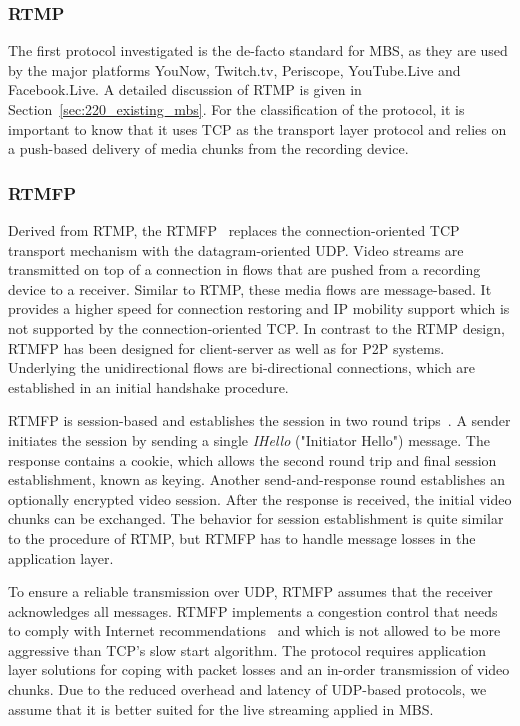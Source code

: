 \subsubsection{\acf{RTMP}}
The first protocol investigated is the de-facto standard for \ac{MBS}, as they are used by the major platforms YouNow, Twitch.tv, Periscope, YouTube.Live and Facebook.Live.
A detailed discussion of \ac{RTMP} is given in Section~\ref{sec:220_existing_mbs}.
For the classification of the protocol, it is important to know that it uses \ac{TCP} as the transport layer protocol and relies on a push-based delivery of media chunks from the recording device.
\subsubsection{\acf{RTMFP}}
Derived from \ac{RTMP}, the \ac{RTMFP}~\cite{rfc7016} replaces the connection-oriented \ac{TCP} transport mechanism with the datagram-oriented \ac{UDP}.
Video streams are transmitted on top of a connection in flows that are pushed from a recording device to a receiver.
Similar to \ac{RTMP}, these media flows are message-based.
It provides a higher speed for connection restoring and \ac{IP} mobility support which is not supported by the connection-oriented \ac{TCP}. 
In contrast to the \ac{RTMP} design, \ac{RTMFP} has been designed for client-server as well as for \ac{P2P} systems.
Underlying the unidirectional flows are bi-directional connections, which are established in an initial handshake procedure.

\ac{RTMFP} is session-based and establishes the session in two round trips~\cite{rfc7016}. 
A sender initiates the session by sending a single \emph{IHello} ("Initiator Hello") message.
The response contains a cookie, which allows the second round trip and final session establishment, known as keying.
Another send-and-response round establishes an optionally encrypted video session.
After the response is received, the initial video chunks can be exchanged.
The behavior for session establishment is quite similar to the procedure of \ac{RTMP}, but \ac{RTMFP} has to handle message losses in the application layer.

To ensure a reliable transmission over \ac{UDP}, \ac{RTMFP} assumes that the receiver acknowledges all messages.
\ac{RTMFP} implements a congestion control that needs to comply with Internet recommendations~\cite{rfc2914} and which is not allowed to be more aggressive than \ac{TCP}'s slow start algorithm.
The protocol requires application layer solutions for coping with packet losses and an in-order transmission of video chunks.
Due to the reduced overhead and latency of \ac{UDP}-based protocols, we assume that it is better suited for the live streaming applied in \ac{MBS}. 
